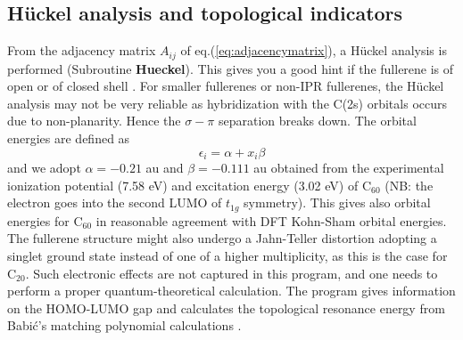 \documentclass[article,a4paper,twoside]{memoir}
\newcommand{\C}[1]{\ensuremath{\mathrm{C}_{#1}}}
\newcommand{\funname}[1]{{\color{blue}\textbf{#1}}}
\begin{document}
\subsection{H\"uckel analysis and topological indicators}
From the adjacency matrix $A_{ij}$ of eq.(\ref{eq:adjacencymatrix}), a H\"uckel analysis is performed (Subroutine \funname{Hueckel}). This gives you a good hint if the 
fullerene is of open or of closed shell \cite{Atlas}. For smaller fullerenes or non-IPR fullerenes, the H\"uckel analysis may not be very reliable 
as hybridization with the C(2s) orbitals occurs due to non-planarity. Hence the $\sigma-\pi$ separation breaks down. The orbital energies are defined as
\begin{equation}
  \label{Hueckel}
  \epsilon_i=\alpha+x_i\beta
\end{equation}
and we adopt $\alpha = -0.21$ au  and  $\beta = -0.111$ au obtained
from the experimental ionization potential (7.58 eV) and excitation energy (3.02 eV) of \C{60} (NB: the electron goes 
into the second LUMO of $t_{1g}$ symmetry). This gives also orbital energies for \C{60} in reasonable 
agreement with DFT Kohn-Sham orbital energies. The fullerene structure might also undergo a Jahn-Teller distortion adopting a singlet 
ground state instead of one of a higher multiplicity, as this is the case for \C{20}. Such electronic effects are not
captured in this program, and one needs to perform a proper quantum-theoretical calculation. The program gives information
on the HOMO-LUMO gap and calculates the topological resonance energy from Babi\'c's matching polynomial calculations \cite{Babic1995,Babic1997}.
\end{document}
